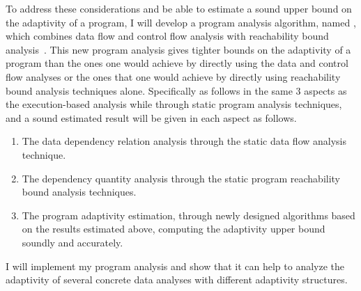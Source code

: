 \begin{itemize}
To address these considerations and be able to estimate a sound upper bound on the adaptivity of a program, 
I will develop a program analysis algorithm, named {\THESYSTEM}, which combines data flow and control flow analysis with reachability bound analysis~\cite{GulwaniZ10}. 
This new program analysis gives tighter bounds on the adaptivity of a program than the ones one would achieve by directly using the data and control flow analyses or the ones that one would achieve by directly using reachability bound analysis techniques alone. Specifically as follows in the same 3 aspects as the execution-based analysis 
while through static program analysis techniques, and a sound estimated result will be given in each aspect as follows.
\begin{enumerate}
\item The data dependency relation analysis through the static data flow analysis technique.
\item The dependency quantity analysis through the static program reachability bound analysis techniques.
\item The program adaptivity estimation, through newly designed algorithms based on the results estimated above, 
computing the adaptivity upper bound soundly 
and accurately.
\end{enumerate}
\end{itemize}
I will implement my program analysis and show that it can help to analyze the adaptivity of several concrete data analyses with different adaptivity structures.
